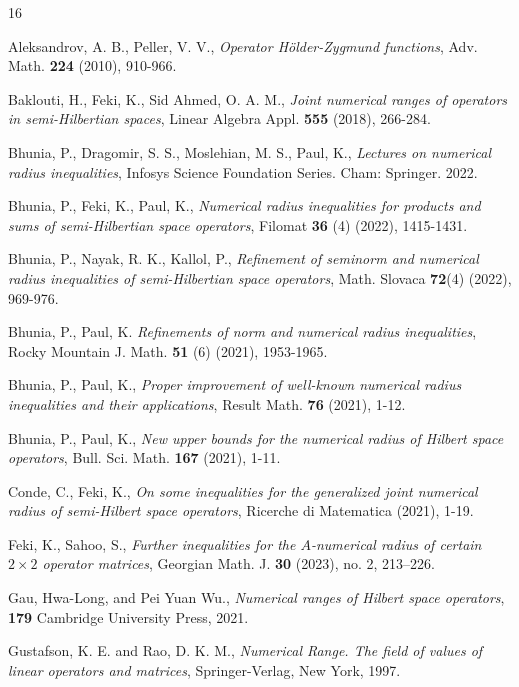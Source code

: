 \documentclass[preprint,12pt,3p]{elsarticle}
\begin{document}
\begin{thebibliography}{16}

 Aleksandrov, A. B., Peller, V. V., \textit{Operator Hölder-Zygmund functions}, Adv. Math. {\bf 224} (2010), 910-966.

 Baklouti, H., Feki, K., Sid Ahmed, O. A. M., \textit{Joint numerical ranges of operators in semi-Hilbertian spaces}, Linear Algebra Appl. {\bf 555}  (2018), 266-284.

 Bhunia, P., Dragomir, S. S., Moslehian, M. S., Paul, K., \textit{Lectures on numerical radius inequalities}, Infosys Science Foundation Series. Cham: Springer. 2022.


 Bhunia, P., Feki, K., Paul, K., \textit{Numerical radius inequalities for products and sums of semi-Hilbertian space operators}, Filomat {\bf 36} (4) (2022), 1415-1431.

 Bhunia, P., Nayak, R. K., Kallol, P., \textit{Refinement of seminorm and numerical radius inequalities of semi-Hilbertian space operators}, Math. Slovaca  {\bf 72}(4) (2022), 969-976.

 Bhunia, P., Paul, K. \textit{Refinements of norm and numerical radius inequalities}, Rocky Mountain J. Math. {\bf 51} (6) (2021), 1953-1965.

 Bhunia, P., Paul, K., \textit{Proper improvement of well-known numerical radius inequalities and their applications}, Result Math. {\bf 76} (2021), 1-12.


 Bhunia, P., Paul, K., \textit{New upper bounds for the numerical radius of Hilbert space operators}, Bull. Sci. Math. {\bf 167} (2021), 1-11.


 Conde, C., Feki, K., \textit{On some inequalities for the generalized joint numerical radius of semi-Hilbert space operators}, Ricerche di Matematica (2021), 1-19. 

 Feki, K., Sahoo, S., \textit{Further inequalities for the ${A}$-numerical radius of certain $2 \times 2$ operator matrices}, {Georgian Math. J.} {\textbf { 30}} (2023), no. 2, 213–226.


Gau, Hwa-Long, and Pei Yuan Wu., \textit{Numerical ranges of Hilbert space operators}, {\bf179} Cambridge University Press, 2021.

Gustafson, K. E. and Rao, D. K. M., \textit{Numerical Range. The field of values of linear operators and matrices}, {Springer-Verlag}, New York, 1997.



\end{thebibliography}
\end{document}
